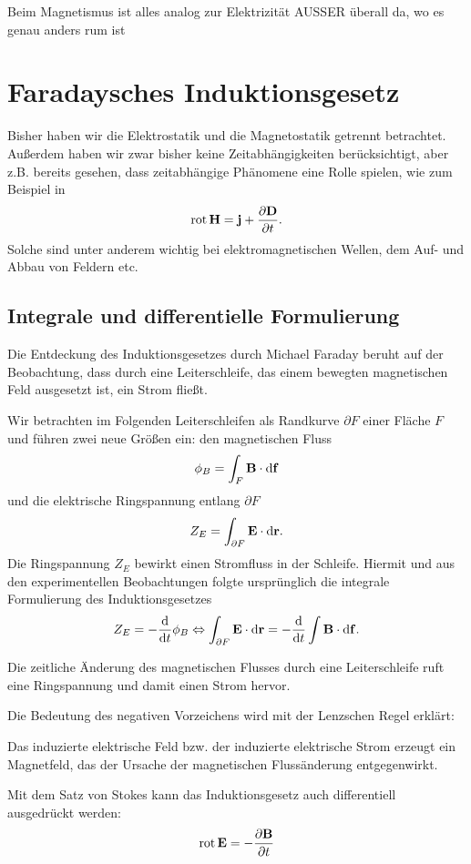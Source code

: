 Beim Magnetismus ist alles analog zur Elektrizität AUSSER überall da, wo es genau anders rum ist

\section{Faradaysches Induktionsgesetz}

Bisher haben wir die Elektrostatik und die Magnetostatik getrennt betrachtet. Außerdem haben wir zwar bisher keine Zeitabhängigkeiten berücksichtigt, aber z.B. bereits gesehen, dass zeitabhängige Phänomene eine Rolle spielen, wie zum Beispiel in
\begin{equation*}
	\operatorname{rot} \mathbf{H}=\mathbf{j}+\frac{\partial \mathbf{D}}{\partial t}.
\end{equation*}
Solche sind unter anderem wichtig bei elektromagnetischen Wellen, dem Auf- und Abbau von Feldern etc.

\subsection{Integrale und differentielle Formulierung}

Die Entdeckung des Induktionsgesetzes durch Michael Faraday beruht auf der Beobachtung, dass durch eine Leiterschleife, das einem bewegten magnetischen Feld ausgesetzt ist, ein Strom fließt.

Wir betrachten im Folgenden Leiterschleifen als Randkurve $\partial F$ einer Fläche $F$ und führen zwei neue Größen ein: den magnetischen Fluss
\begin{equation*}
	\phi _{B}=\int _{F}\mathbf{B}\cdot \mathop{}\!\mathrm{d} \mathbf{f}
\end{equation*}
und die elektrische Ringspannung entlang $\partial F$
\begin{equation*}
	Z_{E}=\int _{\partial F}\mathbf{E}\cdot \mathop{}\!\mathrm{d} \mathbf{r}.
\end{equation*}
Die Ringspannung $Z_{E}$ bewirkt einen Stromfluss in der Schleife. Hiermit und aus den experimentellen Beobachtungen folgte ursprünglich die integrale Formulierung des Induktionsgesetzes
\begin{equation*}
	Z_{E}=-\frac{\mathop{}\!\mathrm{d} }{\mathop{}\!\mathrm{d} t}\phi _{B}\Leftrightarrow \int _{\partial F}\mathbf{E}\cdot \mathop{}\!\mathrm{d} \mathbf{r}=-\frac{\mathop{}\!\mathrm{d} }{\mathop{}\!\mathrm{d} t}\int \mathbf{B}\cdot \mathop{}\!\mathrm{d} \mathbf{f}.
\end{equation*}

\begin{formal}
	Die zeitliche Änderung des magnetischen Flusses durch eine Leiterschleife ruft eine Ringspannung und damit einen Strom hervor.
\end{formal}
Die Bedeutung des negativen Vorzeichens wird mit der Lenzschen Regel erklärt:
\begin{formal}
	Das induzierte elektrische Feld bzw. der induzierte elektrische Strom erzeugt ein Magnetfeld, das der Ursache der magnetischen Flussänderung entgegenwirkt.
\end{formal}
Mit dem Satz von Stokes kann das Induktionsgesetz auch differentiell ausgedrückt werden:
\begin{equation*}
	\operatorname{rot} \mathbf{E}=-\frac{\partial \mathbf{B}}{\partial t}
\end{equation*}

